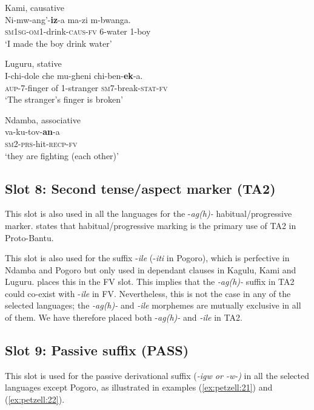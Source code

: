 \documentclass[output=paper,
            colorlinks, citecolor=brown
            ,draftmode
		  ]{langscibook}
\begin{document}
\ex\label{ex:petzell:18} Kami, causative\\
\gll Ni-mw-ang'-\textbf{iz}{}-a           ma-zi    m-bwanga.\\
\textsc{sm}1\textsc{sg}{}-\textsc{om1}{}-drink-\textsc{{caus}}{}-\textsc{fv}     6-water  1-boy\\
\glt `I made the boy drink water'


\ex\label{ex:petzell:19}Luguru, stative\\
\gll I-chi-dole    che   mu-gheni   chi-ben-\textbf{ek}{}-a.\\
\textsc{aup-7-}finger  of    1-stranger    \textsc{sm7}{}-break-\textsc{{stat}}{}-\textsc{fv}\\
\glt `The stranger’s finger is broken'


\ex\label{ex:petzell:20}Ndamba, associative\\
\gll va-ku-tov-\textbf{an}{}-a  \\
\textsc{sm2}{}-\textsc{prs}{}-hit-\textsc{{recp}}{}-\textsc{fv}\\
\glt `they are fighting (each other)'
\z

\subsection{Slot 8: Second tense/aspect marker (TA2)}\label{sec:petzell:2.8}

This slot is also used in all the languages for the -\textit{ag(h)-} habitual/progressive marker. \citet[110]{Meeussen1967} states that habitual/progressive marking is the primary use of TA2 in Proto-Bantu.



This slot is also used for the suffix -\textit{ile} (-\textit{iti} in Pogoro), which is perfective in Ndamba and Pogoro but only used in dependant clauses in Kagulu, Kami and Luguru. \citet[111]{Meeussen1967} places this in the FV slot. This implies that the \textit{{}-ag(h)-} suffix in TA2 could co-exist with -\textit{ile} in FV. Nevertheless, this is not the case in any of the selected languages; the \textit{{}-ag(h)-} and \textit{{}-ile} morphemes are mutually exclusive in all of them. We have therefore placed both -\textit{ag(h)-} and \textit{{}-ile} in TA2.


\subsection{Slot 9: Passive suffix (PASS)}\label{sec:petzell:2.9}

This slot is used for the passive derivational suffix (\textit{{}-igw or -w-)} in all the selected languages except Pogoro, as illustrated in examples (\ref{ex:petzell:21}) and (\ref{ex:petzell:22}).
\end{document}
